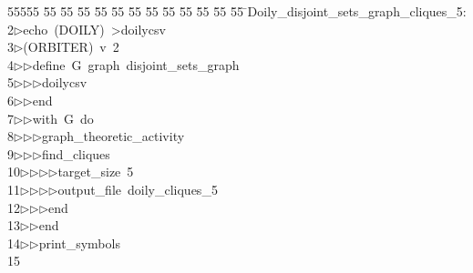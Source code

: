 %
%
\begin{tabbing}
55555 \= 55 \= 55 \= 55 \= 55 \= 55 \= 55 \= 55 \= 55 \= 55 \= 55 \= 55 \= 55 \= \>Doily\_disjoint\_sets\_graph\_cliques\_5:\\[0pt]
2\>$\triangleright$\>echo\ (DOILY)\ {\textgreater}doilycsv\\[0pt]
3\>$\triangleright$\>(ORBITER)\ v\ 2\ \\[0pt]
4\>$\triangleright$\>$\triangleright$\>define\ G\ graph\ disjoint\_sets\_graph\ \\[0pt]
5\>$\triangleright$\>$\triangleright$\>$\triangleright$\>doilycsv\ \\[0pt]
6\>$\triangleright$\>$\triangleright$\>end\ \\[0pt]
7\>$\triangleright$\>$\triangleright$\>with\ G\ do\ \\[0pt]
8\>$\triangleright$\>$\triangleright$\>$\triangleright$\>graph\_theoretic\_activity\ \\[0pt]
9\>$\triangleright$\>$\triangleright$\>$\triangleright$\>find\_cliques\ \\[0pt]
10\>$\triangleright$\>$\triangleright$\>$\triangleright$\>$\triangleright$\>target\_size\ 5\ \\[0pt]
11\>$\triangleright$\>$\triangleright$\>$\triangleright$\>$\triangleright$\>output\_file\ doily\_cliques\_5\ \\[0pt]
12\>$\triangleright$\>$\triangleright$\>$\triangleright$\>end\ \\[0pt]
13\>$\triangleright$\>$\triangleright$\>end\ \\[0pt]
14\>$\triangleright$\>$\triangleright$\>print\_symbols\\[0pt]
15\>\end{tabbing}
